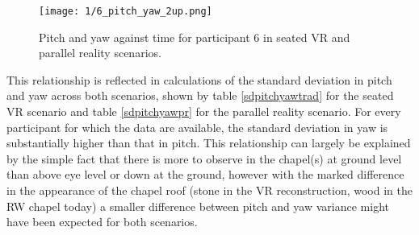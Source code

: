 \begin{figure}
	\begin{center}
	\texttt{[image: 1/6\_pitch\_yaw\_2up.png]}
	\caption{Pitch and yaw against time for participant 6 in seated VR and parallel reality scenarios.}
	\label{6_pitch_yaw_2up.png}
	\end{center}
\end{figure}

This relationship is reflected in calculations of the standard deviation in pitch and yaw across both scenarios, shown by table \ref{sdpitchyawtrad} for the seated VR scenario and table \ref{sdpitchyawpr} for the parallel reality scenario. For every participant for which the data are available, the standard deviation in yaw is substantially higher than that in pitch. This relationship can largely be explained by the simple fact that there is more to observe in the chapel(s) at ground level than above eye level or down at the ground, however with the marked difference in the appearance of the chapel roof (stone in the VR reconstruction, wood in the RW chapel today) a smaller difference between pitch and yaw variance might have been expected for both scenarios.


